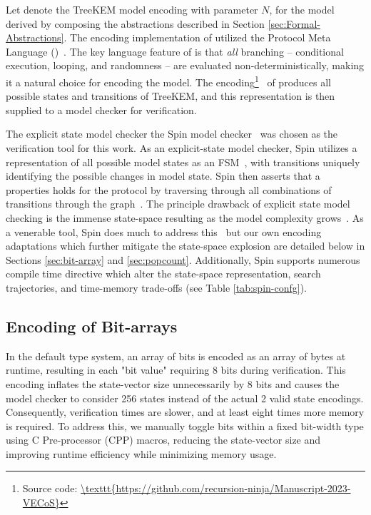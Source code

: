 \documentclass[runningheads]{llncs}
\newcommand{\Abrev}[1]{\gls{#1}}
\begin{document}
Let  denote the TreeKEM model encoding with parameter $N$, for the model derived by composing the abstractions described in Section \ref{sec:Formal-Abstractions}.
The encoding implementation of  utilized the Protocol Meta Language (\Promela)~\cite{HolzmannSpinBook2003}.
The key language feature of \Promela is that \emph{all} branching -- conditional execution, looping, and randomness -- are evaluated non-deterministically, making it a natural choice for encoding the model.
The \Promela encoding\footnote{Source code: \url{\texttt{https://github.com/recursion-ninja/Manuscript-2023-VECoS}}}\ %
of  produces all possible states and transitions of TreeKEM, and this representation is then supplied to a model checker for verification.

The explicit state model checker the Spin model checker~\cite{HolzmannSpinBook2003} was chosen as the verification tool for this work.
As an explicit-state model checker, Spin utilizes a representation of all possible model states as an \Abrev{FSM}~\cite{clarke1981design}, with transitions uniquely identifying the possible changes in model state.
Spin then asserts that a properties holds for the protocol by traversing through all combinations of transitions through the graph~\cite{Vardi1986}.
The principle drawback of explicit state model checking is the immense state-space resulting as the model complexity grows~\cite{burch1992symbolic}.
As a venerable tool, Spin does much to address this~\cite{rudin1987limits} but our own encoding adaptations which further mitigate the state-space explosion are detailed below in Sections \ref{sec:bit-array} and \ref{sec:popcount}.
Additionally, Spin supports numerous compile time directive which alter the state-space representation, search trajectories, and time-memory trade-offs (see Table \ref{tab:spin-confg}).


\subsection{Encoding  of Bit-arrays\label{sec:bit-array}}

In the default \Promela type system, an array of bits is encoded as an array of bytes at runtime, resulting in each "bit value" requiring 8 bits during verification.
This encoding inflates the state-vector size unnecessarily by 8 bits and causes the model checker to consider 256 states instead of the actual 2 valid state encodings.
Consequently, verification times are slower, and at least eight times more memory is required.
To address this, we manually toggle bits within a fixed bit-width \Promela type using C Pre-processor (CPP) macros, reducing the state-vector size and improving runtime efficiency while minimizing memory usage.
\end{document}

